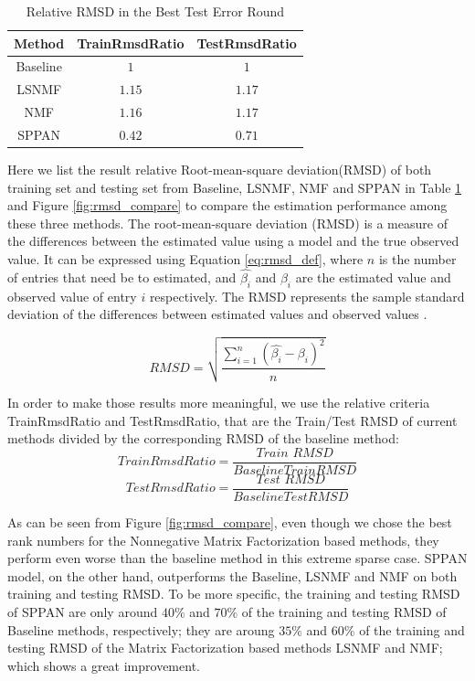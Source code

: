 \documentclass[conference,compsoc]{IEEEtran}
\begin{document}
\begin{table}[!ht]
\centering
	\begin{tabular}{|c|c|c|}
	\hline	\hline
	Method &  TrainRmsdRatio&TestRmsdRatio\\ \hline
	Baseline  & $1$  & $1$\\ 
	LSNMF & $1.15$  & $1.17$\\ 
	NMF  & $1.16$  & $1.17$ \\ 
	SPPAN  & $0.42$  & $0.71$\\ \hline
	\end{tabular}
	\caption{Relative RMSD in the Best Test Error Round}
\label{tab:rmsd_compare}
\end{table}

Here we list the result relative Root-mean-square deviation(RMSD) of both training set and testing set from Baseline, LSNMF, NMF and SPPAN in Table \ref{tab:rmsd_compare} and Figure \ref{fig:rmsd_compare} to compare the estimation performance among these three methods. 
 The root-mean-square deviation (RMSD) is a measure of the differences between the estimated value using a model and the true observed value. It can be expressed using Equation \ref{eq:rmsd_def}, where $n$ is the number of entries that need be to estimated, and $\hat{\beta_i}$ and $\beta_i$ are the estimated value and observed value of entry $i$ respectively. The RMSD represents the sample standard deviation of the differences between estimated values and observed values \cite{hyndman2006another}. 

\begin{equation}
\label{eq:rmsd_def}
RMSD=\sqrt{\frac{\sum\limits_{i=1}^{n}(\hat{\beta_i}-\beta_i)^2}{n}}
\end{equation}

In order to make those results more meaningful, we use the relative criteria TrainRmsdRatio and TestRmsdRatio, that are the Train/Test RMSD of current methods divided by the corresponding RMSD of the baseline method:
\[
TrainRmsdRatio=\frac{\textit{Train RMSD}}{Baseline Train RMSD}
\]
\[
TestRmsdRatio=\frac{\textit{Test RMSD}}{Baseline Test RMSD}
\]

As can be seen from Figure \ref{fig:rmsd_compare}, even though we chose the best rank numbers for the Nonnegative Matrix Factorization based methods, they perform even worse than the baseline method in this extreme sparse case. SPPAN model, on the other hand, outperforms the Baseline, LSNMF and NMF on both training and testing RMSD. To be more specific, the training and testing RMSD of SPPAN are only around $40\%$ and $70\%$ of the training and testing RMSD of Baseline methods, respectively; they are aroung $35\%$ and $60\%$ of the training and testing RMSD of the Matrix Factorization based methods LSNMF and NMF; which shows a great improvement.
\end{document}
